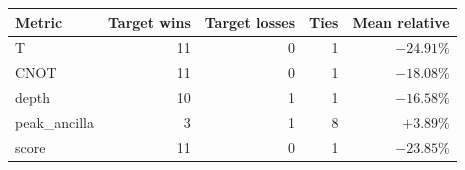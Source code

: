 \begin{tabular}{lrrrr}
\toprule
Metric & Target wins & Target losses & Ties & Mean relative \\
\midrule
T & 11 & 0 & 1 & $-24.91\%$ \\
CNOT & 11 & 0 & 1 & $-18.08\%$ \\
depth & 10 & 1 & 1 & $-16.58\%$ \\
peak_ancilla & 3 & 1 & 8 & $+3.89\%$ \\
score & 11 & 0 & 1 & $-23.85\%$ \\
\bottomrule
\end{tabular}
